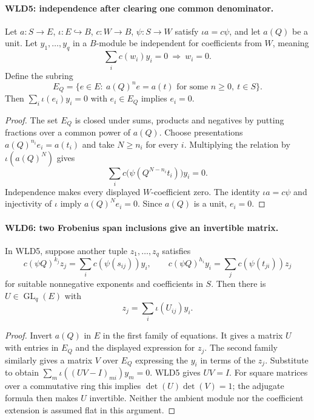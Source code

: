 \documentclass[11pt,a4paper]{article}
\numberwithin{equation}{section}
\theoremstyle{remark}\newtheorem{remark}[theorem]{Remark}
\begin{document}
\paragraph{WLD5: independence after clearing one common denominator.}
\label{claim:WLD5}
Let $a:S\to E$, $\iota:E\hookrightarrow B$, $c:W\to B$,
$\psi:S\to W$ satisfy $\iota a=c\psi$, and let $a(Q)$ be a unit.
Let $y_1,\ldots,y_q$ in a $B$-module be independent for coefficients
from $W$, meaning
\[
             \sum_i c(w_i)y_i=0\ \Longrightarrow\ w_i=0.
\]
Define the subring
\[
 E_Q=\{e\in E:\ a(Q)^ne=a(t)
                    \text{ for some }n\ge0,\ t\in S\}.
\]
Then $\sum_i\iota(e_i)y_i=0$ with $e_i\in E_Q$ implies $e_i=0$.

\begin{proof}
The set $E_Q$ is closed under sums, products and negatives by putting
fractions over a common power of $a(Q)$. Choose presentations
$a(Q)^{n_i}e_i=a(t_i)$ and take $N\ge n_i$ for every $i$.
Multiplying the relation by $\iota(a(Q)^N)$ gives
\[
        \sum_i c\bigl(\psi(Q^{N-n_i}t_i)\bigr)y_i=0.
\]
Independence makes every displayed $W$-coefficient zero.
The identity $\iota a=c\psi$ and injectivity of $\iota$ imply
$a(Q)^Ne_i=0$. Since $a(Q)$ is a unit, $e_i=0$.
\end{proof}

\paragraph{WLD6: two Frobenius span inclusions give an invertible matrix.}
\label{claim:WLD6}
In WLD5, suppose another tuple $z_1,\ldots,z_q$ satisfies
\[
 c(\psi Q)^{k_j}z_j=\sum_i c(\psi(s_{ij}))y_i,\qquad
 c(\psi Q)^{h_i}y_i=\sum_j c(\psi(t_{ji}))z_j
\]
for suitable nonnegative exponents and coefficients in $S$.
Then there is $U\in\operatorname{GL}_q(E)$ with
\[
                         z_j=\sum_i\iota(U_{ij})y_i.       \tag{WLD.6}
\]

\begin{proof}
Invert $a(Q)$ in $E$ in the first family of equations. It gives a
matrix $U$ with entries in $E_Q$ and the displayed expression for
$z_j$. The second family similarly gives a matrix $V$ over $E_Q$
expressing the $y_i$ in terms of the $z_j$. Substitute to obtain
$\sum_m\iota((UV-I)_{mi})y_m=0$. WLD5 gives $UV=I$.
For square matrices over a commutative ring this implies
$\det(U)\det(V)=1$; the adjugate formula then makes $U$ invertible.
Neither the ambient module nor the coefficient extension is assumed
flat in this argument.
\end{proof}
\end{document}
